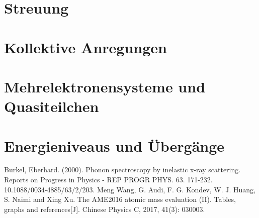 \documentclass[]{scrartcl}
\numberwithin{question}{section}
\numberwithin{figure}{section}
\numberwithin{table}{section}
\begin{document}
\cleardoublepage
\section{Streuung}


\cleardoublepage
\section{Kollektive Anregungen}


\cleardoublepage
\section{Mehrelektronensysteme und Quasiteilchen}


\cleardoublepage
\section{Energieniveaus und Übergänge}


\begin{thebibliography}{9}
     Burkel, Eberhard. (2000). Phonon spectroscopy by inelastic x-ray scattering. Reports on Progress in Physics - REP PROGR PHYS. 63. 171-232. 10.1088/0034-4885/63/2/203. 
     Meng Wang, G. Audi, F. G. Kondev, W. J. Huang, S. Naimi and Xing Xu. The AME2016 atomic mass evaluation (II). Tables, graphs and references[J]. Chinese Physics C, 2017, 41(3): 030003.
    
\end{thebibliography}
\end{document}
